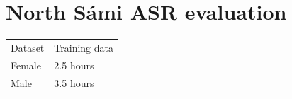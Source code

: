 \documentclass[b5paper]{article}
\newcommand{\ns}{{North Sámi }}
\begin{document}
%
%


\section{\ns ASR evaluation} 
\begin{table}[h!]
\begin{tabular}{ll}
Dataset & Training data\\
Female & 2.5 hours\\
Male & 3.5 hours\\
\end{tabular}
\end{table}
\end{document}
